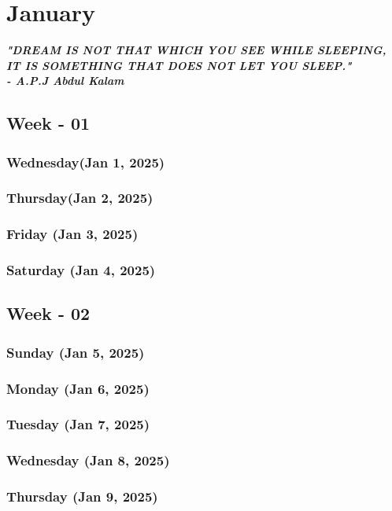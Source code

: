 \chapter{January}
\cite{zhou2015}

\begin{displayquote}
    \textbf{\emph{"DREAM IS NOT THAT WHICH YOU SEE WHILE SLEEPING, IT IS SOMETHING THAT DOES NOT LET YOU SLEEP."\\- A.P.J Abdul Kalam}}
\end{displayquote}
\section{Week - 01}
\subsection*{Wednesday(Jan 1, 2025)} 
\subsection*{Thursday(Jan 2, 2025)}
\subsection*{Friday (Jan 3, 2025)}
\subsection*{Saturday (Jan 4, 2025)}
\section{Week - 02}
\subsection*{Sunday (Jan 5, 2025)}
\subsection*{Monday (Jan 6, 2025)}
\subsection*{Tuesday (Jan 7, 2025)}
\subsection*{Wednesday (Jan 8, 2025)}
\subsection*{Thursday (Jan 9, 2025)}
